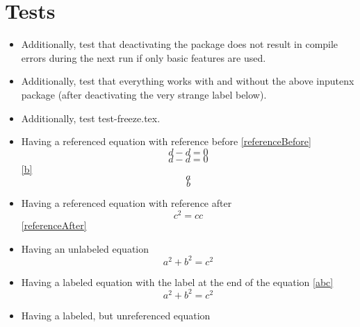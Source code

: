 \documentclass{article}
\begin{document}

	\section*{Tests}
	\begin{itemize}
		\item Additionally, test that deactivating the package does not result in compile errors during the next run if only basic features are used.
		\item Additionally, test that everything works with and without the above inputenx package (after deactivating the very strange label below).
		\item Additionally, test test-freeze.tex.
		\item Having a referenced equation with reference before \ref{referenceBefore}
			\begin{equation}\label{referenceBefore}
				d - d = 0
			\end{equation}
			\begin{equation}\label{referenceNo}
				d - d = 0
			\end{equation}
		\ref{b}\begin{equation}\label{a}a\end{equation}\begin{equation}\label{b}b\end{equation}
		\item Having a referenced equation with reference after
			\begin{equation}\label{referenceAfter}
				c^2 = c c
			\end{equation}
			\ref{referenceAfter}
		\item Having an unlabeled equation
			\begin{equation}
				a^2 + b^2 = c^2
			\end{equation}
		\item Having a labeled equation with the label at the end of the equation \ref{abc}
			\begin{equation}
				a^2 + b^2 = c^2\label{abc}
			\end{equation}
		\item Having a labeled, but unreferenced equation

\end{itemize}
\end{document}

